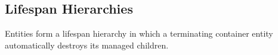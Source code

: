 \documentclass[10pt, conference, compsocconf]{IEEEtran}
\begin{document}
\subsection{Lifespan Hierarchies}
\label{sec.pats.lifespan}

    Entities form a lifespan hierarchy in which a terminating container entity
    automatically destroys its managed children.

\end{document}
